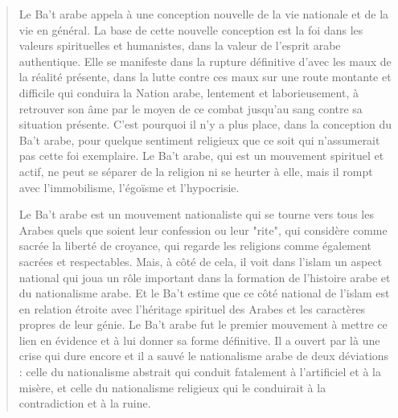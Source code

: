\begin{quote}
Le Ba't arabe appela à une conception nouvelle de la vie nationale et de
la vie en général. La base de cette nouvelle conception est la foi dans
les valeurs spirituelles et humanistes, dans la valeur de l'esprit arabe
authentique. Elle se manifeste dans la rupture définitive d'avec les
maux de la réalité présente, dans la lutte contre ces maux sur une route
montante et difficile qui conduira la Nation arabe, lentement et
laborieusement, à retrouver son âme par le moyen de ce combat jusqu'au
sang contre sa situation présente. C'est pourquoi il n'y a plus place,
dans la conception du Ba't arabe, pour quelque sentiment religieux que
ce soit qui n'assumerait pas cette foi exemplaire. Le Ba't arabe, qui
est un mouvement spirituel et actif, ne peut se séparer de la religion
ni se heurter à elle, mais il rompt avec l'immobilisme, l'égoïsme et
l'hypocrisie.

Le Ba't arabe est un mouvement nationaliste qui se tourne vers tous les
Arabes quels que soient leur confession ou leur "rite", qui considère
comme sacrée la liberté de croyance, qui regarde les religions comme
également sacrées et respectables. Mais, à côté de cela, il voit dans
l'islam un aspect national qui joua un rôle important dans la formation
de l'histoire arabe et du nationalisme arabe. Et le Ba't estime que ce
côté national de l'islam est en relation étroite avec l'héritage
spirituel des Arabes et les caractères propres de leur génie. Le Ba't
arabe fut le premier mouvement à mettre ce lien en évidence et à lui
donner sa forme définitive. Il a ouvert par là une crise qui dure encore
et il a sauvé le nationalisme arabe de deux déviations : celle du
nationalisme abstrait qui conduit fatalement à l'artificiel et à la
misère, et celle du nationalisme religieux qui le conduirait à la
contradiction et à la ruine.


\end{quote}
